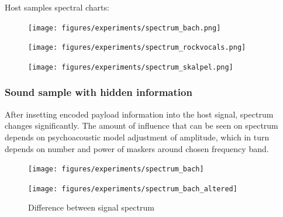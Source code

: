 \documentclass[english,bachelor,a4paper,oneside]{ppfcmthesis}
\begin{document}
\clearpage
\noindent Host samples spectral charts:

\begin{figure}[!hb]
\begin{minipage}[b]{0.45\textwidth}
  \texttt{[image: figures/experiments/spectrum\_bach.png]}
  \label{fig:bach-analysis}
\end{minipage}\hfill
\begin{minipage}[b]{0.45\textwidth}
  \texttt{[image: figures/experiments/spectrum\_rockvocals.png]}
  \label{fig:rockvocals-analysis}
\end{minipage}
\end{figure}
\begin{figure}[!hb]
\begin{minipage}[b]{0.45\textwidth}
  \texttt{[image: figures/experiments/spectrum\_skalpel.png]}
  \label{fig:skalpel-analysis}
\end{minipage}
\end{figure}

\clearpage

\subsubsection{Sound sample with hidden information}
After insetting encoded payload information into the host signal, spectrum changes significantly.
The amount of influence that can be seen on spectrum depends on psychoacoustic model adjustment of amplitude, which in turn depends on number and power of maskers around chosen frequency band.


\begin{figure}[!hb]
  \begin{minipage}[b]{0.45\textwidth}
    \texttt{[image: figures/experiments/spectrum\_bach]}
  \end{minipage}\hfill
  \begin{minipage}[b]{0.45\textwidth}
    \texttt{[image: figures/experiments/spectrum\_bach\_altered]}
  \end{minipage}
  \caption{Difference between signal spectrum}
\end{figure}

\clearpage
\end{document}
